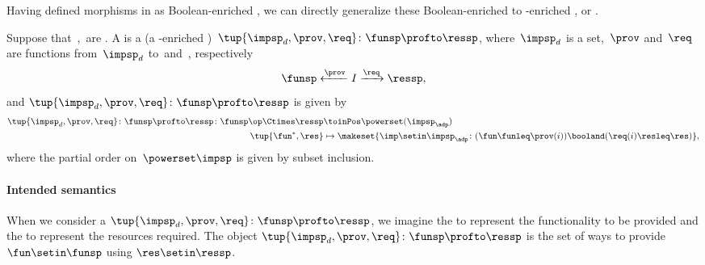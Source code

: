 Having defined morphisms in \DP as Boolean-enriched , we can directly generalize these Boolean-enriched  to \Set-enriched , or .
\begin{widepar}
    \begin{definition}
        \label{def:dpwithimp}
        Suppose that~\funsp,~\ressp are .
        A  is a  (a \Set-enriched )~$\tup{\impsp_d,\prov,\req}\colon \funsp\profto \ressp$, where~$\impsp_d$ is a set,~$\prov$ and~$\req$ are functions from~$\impsp_d$ to~\funsp and~\ressp, respectively
        \begin{equation}
            \funsp \xleftarrow{\prov} I \xrightarrow{\req} \ressp,
        \end{equation}
        and $\tup{\impsp_d,\prov,\req}\colon \funsp\profto \ressp$ is given by
        \begin{equation}
            \begin{aligned}
                \tup{\impsp_d,\prov,\req}\colon \funsp\profto \ressp \colon \funsp\op \Ctimes \ressp & \toinPos \powerset(\impsp_\adp) \\
                \tup{\fun^*, \res}                                                                   & \mapsto \makeset{ \imp \setin \impsp_\adp \colon ( \fun \funleq \prov(i)) \booland (\req(i) \resleq \res) },
            \end{aligned}
        \end{equation}
        where the partial order on~$\powerset\impsp$ is given by subset inclusion.
    \end{definition}
\end{widepar}

\paragraph{Intended semantics}
When we consider a  $\tup{\impsp_d, \prov, \req}\colon \funsp\profto \ressp$, we imagine the  \funsp to represent the functionality to be provided and the  \ressp to represent the resources required.
The object $\tup{\impsp_d,\prov,\req}\colon \funsp\profto \ressp$ is the set of ways to provide $\fun\setin \funsp$ using $\res\setin \ressp$.

